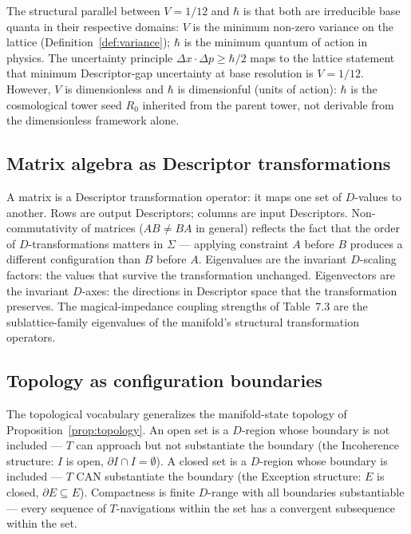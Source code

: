 \documentclass[11pt,a4paper]{article}
\theoremstyle{definition}
\theoremstyle{remark}
\begin{document}
The structural parallel between $V = 1/12$ and $\hbar$ is that both are irreducible base quanta in their respective domains: $V$ is the minimum non-zero variance on the lattice (Definition~\ref{def:variance}); $\hbar$ is the minimum quantum of action in physics. The uncertainty principle $\Delta x \cdot \Delta p \ge \hbar/2$ maps to the lattice statement that minimum Descriptor-gap uncertainty at base resolution is $V = 1/12$. However, $V$ is dimensionless and $\hbar$ is dimensionful (units of action): $\hbar$ is the cosmological tower seed $R_{0}$ inherited from the parent tower, not derivable from the dimensionless framework alone.

\subsection{Matrix algebra as Descriptor transformations}\label{subsec:matrices-D}

A matrix is a Descriptor transformation operator: it maps one set of $D$-values to another. Rows are output Descriptors; columns are input Descriptors. Non-commutativity of matrices ($AB \neq BA$ in general) reflects the fact that the order of $D$-transformations matters in $\Sigma$ --- applying constraint $A$ before $B$ produces a different configuration than $B$ before $A$. Eigenvalues are the invariant $D$-scaling factors: the values that survive the transformation unchanged. Eigenvectors are the invariant $D$-axes: the directions in Descriptor space that the transformation preserves. The magical-impedance coupling strengths of Table~7.3 are the sublattice-family eigenvalues of the manifold's structural transformation operators.

\subsection{Topology as configuration boundaries}\label{subsec:topology-config}

The topological vocabulary generalizes the manifold-state topology of Proposition~\ref{prop:topology}. An open set is a $D$-region whose boundary is not included --- $T$ can approach but not substantiate the boundary (the Incoherence structure: $I$ is open, $\partial I \cap I = \emptyset$). A closed set is a $D$-region whose boundary is included --- $T$ CAN substantiate the boundary (the Exception structure: $E$ is closed, $\partial E \subseteq E$). Compactness is finite $D$-range with all boundaries substantiable --- every sequence of $T$-navigations within the set has a convergent subsequence within the set.
\end{document}
